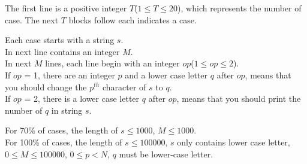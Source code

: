 The first line is a positive integer $T$($1 \leq T \leq 20$), which represents the number of case. The next $T$ blocks follow each indicates a case.

Each case starts with a string $s$.\\
In next line contains an integer $M$.\\
In next $M$ lines, each line begin with an integer $op$($1 \leq op \leq 2$).\\
If $op$ = 1, there are an integer $p$ and a lower case letter $q$ after $op$, means that you should change the $p^{th}$ character of $s$ to $q$.\\
If $op$ = 2, there is a lower case letter $q$ after $op$, means that you should print the number of $q$ in string $s$.

For 70\% of cases, the length of $s \leq 1000$, $M \leq 1000$.\\
For 100\% of cases, the length of $s \leq 100000$, $s$ only contains lower case letter, $0 \leq M \leq 100000$, $0 \leq p < N$, $q$ must be lower-case letter. 